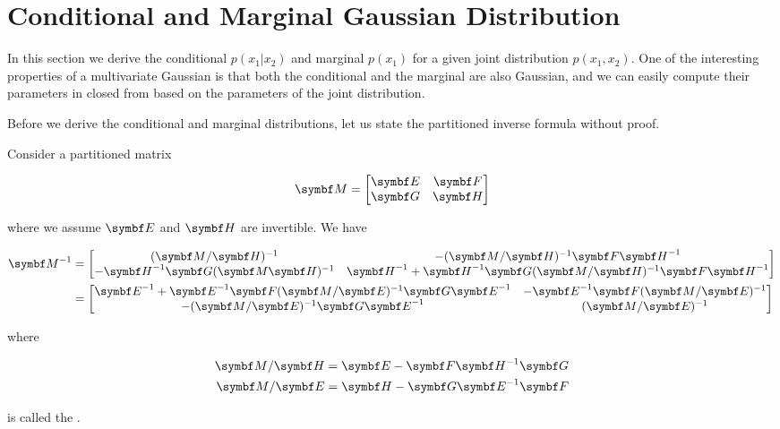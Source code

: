 \section{Conditional and Marginal Gaussian Distribution}

In this section we derive the conditional $p(x_1 | x_2)$ and marginal $p(x_1)$
for a given joint distribution $p(x_1, x_2)$. One of the interesting properties
of a multivariate Gaussian is that both the conditional and the marginal are
also Gaussian, and we can easily compute their parameters in closed from based
on the parameters of the joint distribution.

Before we derive the conditional and marginal distributions, let us state
the partitioned inverse formula without proof.

\begin{thm} Consider a partitioned matrix

  \begin{equation}
    \mM = \begin{bmatrix} \mE & \mF \\ \mG & \mH \end{bmatrix}
  \end{equation}

  where we assume $\mE$ and $\mH$ are invertible. We have

  \begin{align}
    \mM^{-1} &= \begin{bmatrix}
      (\mM / \mH)^{-1} & -(\mM / \mH)^{-1} \mF \mH^{-1} \\
      -\mH^{-1} \mG (\mM \mH)^{-1} & \mH^{-1} + \mH^{-1} \mG (\mM / \mH)^{-1} \mF \mH^{-1}
    \end{bmatrix} \\
             &= \begin{bmatrix}
      \mE^{-1} + \mE^{-1} \mF (\mM / \mE)^{-1} \mG \mE^{-1} & - \mE^{-1} \mF (\mM / \mE)^{-1} \\
      -(\mM / \mE)^{-1} \mG \mE^{-1} & (\mM / \mE)^{-1}
    \end{bmatrix}
    \label{eq:matrix-inversion-lemma}
  \end{align}

  where

  \begin{align}
    \mM / \mH &= \mE - \mF \mH^{-1} \mG \\
    \mM / \mE &= \mH - \mG \mE^{-1} \mF
  \end{align}

  is called the .
\end{thm}

